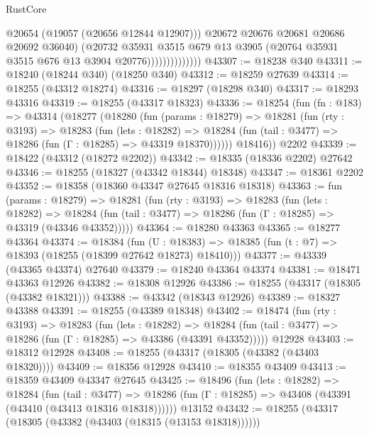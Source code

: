 \begin{lexlean}{RustCore}
\begin{coremodule}
                                @20654
                                (@19057 (@20656 @12844 @12907)))
                              @20672
                              @20676
                              @20681
                              @20686
                              @20692
                              @36040)
                            (@20732
                              @35931
                              @3515
                              @679
                              @13
                              @3905
                              (@20764 @35931 @3515 @676 @13 @3904 @20776))))))))))))))
@43307 := @18238 @340
@43311 := @18240 (@18244 @340) (@18250 @340)
@43312 := @18259 @27639
@43314 := @18255 (@43312 @18274)
@43316 := @18297 (@18298 @340)
@43317 := @18293 @43316
@43319 := @18255 (@43317 @18323)
@43336 := @18254
    (fun (fn : @183) =>
    @43314
      (@18277
        (@18280
          (fun (params : @18279) =>
          @18281
            (fun (rty : @3193) =>
            @18283
              (fun (lets : @18282) =>
              @18284 (fun (tail : @3477) => @18286 (fun (Γ : @18285) => @43319 @18370))))))
        @18416))
    @2202
@43339 := @18422 (@43312 (@18272 @2202))
@43342 := @18335 (@18336 @2202) @27642
@43346 := @18255 (@18327 (@43342 @18344) @18348)
@43347 := @18361 @2202
@43352 := @18358 (@18360 @43347 @27645 @18316 @18318)
@43363 := fun (params : @18279) =>
  @18281
    (fun (rty : @3193) =>
    @18283
      (fun (lets : @18282) =>
      @18284 (fun (tail : @3477) => @18286 (fun (Γ : @18285) => @43319 (@43346 @43352)))))
@43364 := @18280 @43363
@43365 := @18277 @43364
@43374 := @18384
    (fun (U : @18383) => @18385 (fun (t : @7) => @18393 (@18255 (@18399 @27642 @18273) @18410)))
@43377 := @43339 (@43365 @43374) @27640
@43379 := @18240 @43364 @43374
@43381 := @18471 @43363 @12926
@43382 := @18308 @12926
@43386 := @18255 (@43317 (@18305 (@43382 @18321)))
@43388 := @43342 (@18343 @12926)
@43389 := @18327 @43388
@43391 := @18255 (@43389 @18348)
@43402 := @18474
    (fun (rty : @3193) =>
    @18283
      (fun (lets : @18282) =>
      @18284 (fun (tail : @3477) => @18286 (fun (Γ : @18285) => @43386 (@43391 @43352)))))
    @12928
@43403 := @18312 @12928
@43408 := @18255 (@43317 (@18305 (@43382 (@43403 @18320))))
@43409 := @18356 @12928
@43410 := @18355 @43409
@43413 := @18359 @43409 @43347 @27645
@43425 := @18496
    (fun (lets : @18282) =>
    @18284
      (fun (tail : @3477) =>
      @18286 (fun (Γ : @18285) => @43408 (@43391 (@43410 (@43413 @18316 @18318))))))
    @13152
@43432 := @18255 (@43317 (@18305 (@43382 (@43403 (@18315 (@13153 @18318))))))

\end{coremodule}
\end{lexlean}
